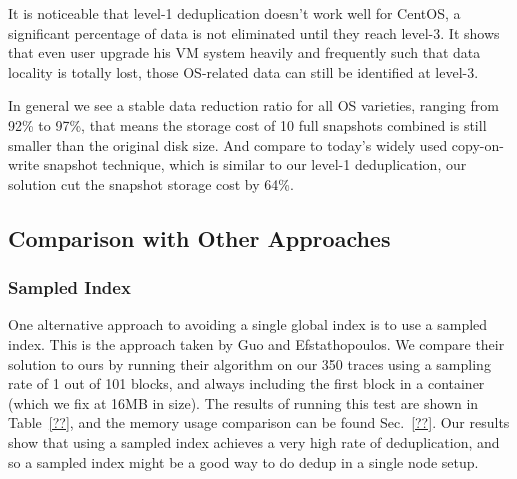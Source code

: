 It is noticeable that level-1 deduplication doesn't work well for CentOS, a significant percentage of data is not
eliminated until they reach level-3. It shows that even user upgrade his VM system heavily and frequently
such that data locality is totally lost, those OS-related data can still be identified at level-3. 

In general we see a stable data reduction ratio for all OS varieties, ranging from 92\% to 97\%, that means
the storage cost of 10 full snapshots combined is still smaller than the original disk size. And compare to 
today's widely used copy-on-write snapshot technique, which is similar to our level-1 deduplication, our
solution cut the snapshot storage cost by 64\%.





\subsection{Comparison with Other Approaches}
\subsubsection{Sampled Index}
One alternative approach to avoiding a single global index is to use a sampled
index. This is the approach taken by Guo and Efstathopoulos\cite{Guo2011}. We
compare their solution to ours by running their algorithm on our 350 traces
using a sampling rate of 1 out of 101 blocks, and always including the first
block in a container (which we fix at 16MB in size). The results of running this
test are shown in Table~\ref{??}, and the memory usage comparison can be found
Sec.~\ref{??}. Our results show that using a sampled index achieves a very high
rate of deduplication, and so a sampled index might be a good way to do dedup
in a single node setup.

